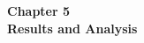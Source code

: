 \begin{center}

    \thispagestyle{empty}
    \vspace*{\fill}
    
    \Huge 
    \textbf{Chapter 5\\ Results and Analysis }
       

    \vspace*{\fill}
\end{center}